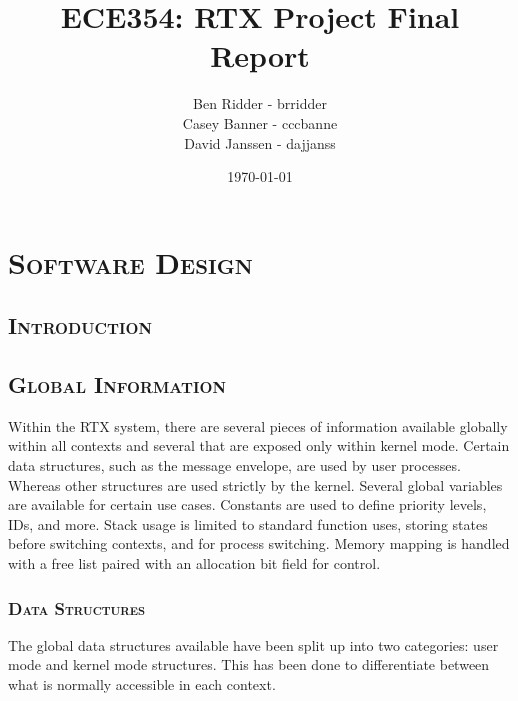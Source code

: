 \documentclass[oneside]{report}
\begin{document}
\lstset{language=C, 
        frame=single, 
        breaklines=true,
        basicstyle=\small\ttfamily,
        columns=fullflexible}


\title{ECE354: RTX Project Final Report}
\author{Ben Ridder - brridder \\
Casey Banner - cccbanne \\
David Janssen - dajjanss }
\date{\today}

\maketitle

\tableofcontents
\listoftables
\lstlistoflistings

\chapter{\textsc{Software Design}}

\section{\textsc{Introduction}}

\section{\textsc{Global Information}}

Within the RTX system, there are several pieces of information available
globally within all contexts and several that are exposed only within kernel
mode. Certain data structures, such as the message envelope, are used by
user processes. Whereas other structures are used strictly by the kernel. 
Several global variables are available for certain use cases. Constants are used 
to define priority levels, IDs, and more. Stack usage is limited to standard
function uses, storing states before switching contexts, and for process
switching. Memory mapping is handled with a free list paired with an allocation
bit field for control.

\subsection{\textsc{Data Structures}}
The global data structures available have been split up into two categories:
user mode and kernel mode structures. This has been done to differentiate
between what is normally accessible in each context.
\end{document}
